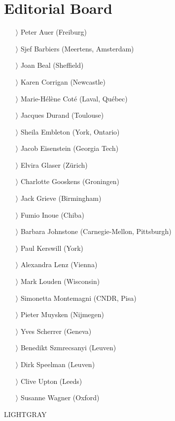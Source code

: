 \documentclass[
notumble,
nofoldmark,
]{leaflet}
\begin{document}
{    \section{Editorial Board}   
    \begin{itemize}
    \item[$\rangle$] Peter Auer (Freiburg)
    \item[$\rangle$] Sjef Barbiers (Meertens, Amsterdam)
    \item[$\rangle$] Joan Beal (Sheffield)
    \item[$\rangle$] Karen Corrigan (Newcastle)
    \item[$\rangle$] Marie-Hélène Cot\'e (Laval, Qu\'ebec)
    \item[$\rangle$] Jacques Durand (Toulouse)
    \item[$\rangle$] Sheila Embleton (York, Ontario)
    \item[$\rangle$] Jacob Eisenstein (Georgia Tech)
    \item[$\rangle$] Elvira Glaser (Z\"urich)
    \item[$\rangle$] Charlotte Gooskens (Groningen)
    \item[$\rangle$] Jack Grieve (Birmingham)
    \item[$\rangle$] Fumio Inoue (Chiba)
    \item[$\rangle$] Barbara Johnstone (Carnegie-Mellon, Pittsburgh)
    \item[$\rangle$] Paul Kerswill (York)
    \item[$\rangle$] Alexandra Lenz (Vienna)
    \item[$\rangle$] Mark Louden (Wisconsin)
    \item[$\rangle$] Simonetta Montemagni (CNDR, Pisa)
    \item[$\rangle$] Pieter Muysken (Nijmegen)
    \item[$\rangle$] Yves Scherrer (Geneva)
    \item[$\rangle$] Benedikt Szmrecsanyi (Leuven)
    \item[$\rangle$] Dirk Speelman (Leuven)
    \item[$\rangle$] Clive Upton (Leeds)
    \item[$\rangle$] Susanne Wagner (Oxford)
    \end{itemize}
    }{LIGHTGRAY}
\end{document}
